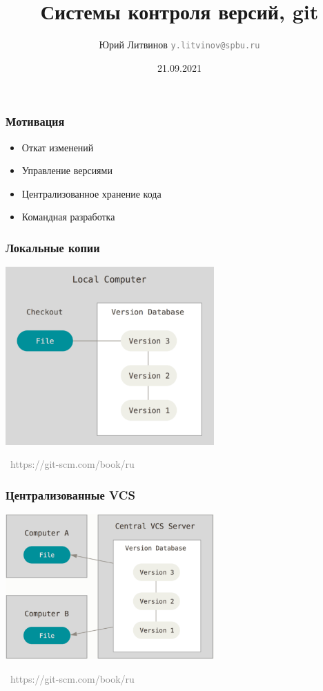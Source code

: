 \documentclass[xetex,mathserif,serif]{beamer}
\title{Системы контроля версий, git}
\author[Юрий Литвинов]{Юрий Литвинов \newline \textcolor{gray}{\small\texttt{y.litvinov@spbu.ru}}}
\date{21.09.2021}
\newcommand{\attribution}[1] {
	\vspace{-5mm}\begin{flushright}\begin{scriptsize}\textcolor{gray}{\textcopyright\, #1}\end{scriptsize}\end{flushright}
}
\begin{document}
	
	\frame{\titlepage}
	
	\begin{frame}
		\frametitle{Мотивация}
		\begin{itemize}
			\item Откат изменений
			\item Управление версиями
			\item Централизованное хранение кода
			\item Командная разработка
		\end{itemize}
	\end{frame}

	\begin{frame}
		\frametitle{Локальные копии}
		\begin{center}
			\includegraphics[width=0.6\textwidth]{localCopies.png}
			\attribution{https://git-scm.com/book/ru}
		\end{center}
	\end{frame}

	\begin{frame}
		\frametitle{Централизованные VCS}
		\begin{center}
			\includegraphics[width=0.6\textwidth]{centralizedVcs.png}
			\attribution{https://git-scm.com/book/ru}
		\end{center}
	\end{frame}
\end{document}
